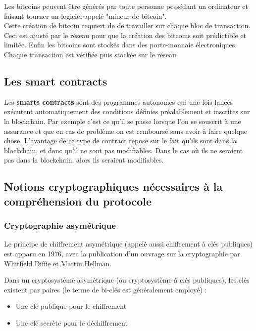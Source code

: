 \documentclass[conference]{IEEEtran}
\begin{document}
Les bitcoins peuvent être générés par toute personne possédant un ordinateur et faisant tourner un logiciel appelé "mineur de bitcoin". \\Cette création de bitcoin requiert de de travailler sur chaque bloc de transaction. Ceci est ajusté par le réseau pour que la création des bitcoins soit prédictible et limitée. Enfin les bitcoins sont stockés dans des porte-monnaie électroniques. Chaque transaction est vérifiée puis stockée sur le réseau.

\vspace{0.3cm}
\subsection{Les smart contracts}
Les \textbf{smarts contracts} sont des programmes autonomes qui une fois lancés exécutent automatiquement des conditions définies préalablement et inscrites sur la blockchain. Par exemple c'est ce qu'il se passe lorsque l'on se souscrit à une assurance et que en cas de problème on est remboursé sans avoir à faire quelque chose.
L'avantage de ce type de contract repose sur le fait qu'ils sont dans la blockchain, et donc qu'il ne sont pas modifiables. Dans le cas où ils ne seraient pas dans la blockchain, alors ils seraient modifiables.

\vspace{0.3cm}
\subsection{Notions cryptographiques nécessaires à la compréhension du protocole}

\subsubsection{Cryptographie asymétrique}
Le principe de chiffrement asymétrique (appelé aussi chiffrement à clés publiques) est apparu en 1976, avec la publication d'un ouvrage sur la cryptographie par Whitfield Diffie et Martin Hellman. \cite{ccmasym, clepub}


Dans un cryptosystème asymétrique (ou cryptosystème à clés publiques), les clés existent par paires (le terme de bi-clés est généralement employé) :
\begin{itemize}
    \item Une clé publique pour le chiffrement
     \item Une clé secrète pour le déchiffrement
\end{itemize}
    
\end{document}
